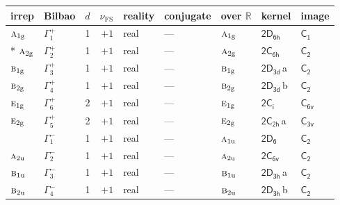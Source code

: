 \documentclass[10pt,a4paper]{article}
\numberwithin{equation}{section}
\newcommand{\grp}[1]{\mathsf{#1}}
\newcommand{\irr}[1]{\text{\normalfont\scshape #1}}
\newcommand{\detbox}[1]{{\setlength{\fboxsep}{1pt}\fbox{#1}}}
\newcommand{\ptag}[1]{\mathrm{#1}}
\newcommand{\clsletter}[1]{\,{\scriptsize\color{black!55}#1}}
\newcommand{\fsind}{\nu_{\mathrm{FS}}}
\begin{document}
{\small\renewcommand{\arraystretch}{1.25}\setlength{\tabcolsep}{4pt}\begin{longtable}{@{}llrrlllll@{}}\toprule
irrep & Bilbao & $d$ & $\fsind$ & reality & conjugate & over $\mathbb{R}$ & kernel & image\\\midrule\endhead
\bottomrule\endfoot\endlastfoot
$\irr{a}_{1\ptag{g}}$ & $\Gamma_{1}^{+}$ & 1 & $+1$ & real & --- & $\irr{a}_{1\ptag{g}}$ & \href{2D6h.pdf}{$\grp{2D_{6h}}$} & \href{../../../rotation/data/pdf/C1.pdf}{$\grp{C_{1}}$}\\*
$\irr{a}_{2\ptag{g}}$ & $\Gamma_{2}^{+}$ & 1 & $+1$ & real & --- & $\irr{a}_{2\ptag{g}}$ & \href{2C6h.pdf}{$\grp{2C_{6h}}$} & \href{../../../rotation/data/pdf/C2.pdf}{$\grp{C_{2}}$}\\
$\irr{b}_{1\ptag{g}}$ & $\Gamma_{3}^{+}$ & 1 & $+1$ & real & --- & $\irr{b}_{1\ptag{g}}$ & \href{2D3d.pdf}{$\grp{2D_{3d}}$}\clsletter{a} & \href{../../../rotation/data/pdf/C2.pdf}{$\grp{C_{2}}$}\\
$\irr{b}_{2\ptag{g}}$ & $\Gamma_{4}^{+}$ & 1 & $+1$ & real & --- & $\irr{b}_{2\ptag{g}}$ & \href{2D3d.pdf}{$\grp{2D_{3d}}$}\clsletter{b} & \href{../../../rotation/data/pdf/C2.pdf}{$\grp{C_{2}}$}\\
$\irr{e}_{1\ptag{g}}$ & $\Gamma_{6}^{+}$ & 2 & $+1$ & real & --- & $\irr{e}_{1\ptag{g}}$ & \href{2S2.pdf}{$\grp{2C_{i}}$} & \href{../../../rotation/data/pdf/C6v.pdf}{$\grp{C_{6v}}$}\\
$\irr{e}_{2\ptag{g}}$ & $\Gamma_{5}^{+}$ & 2 & $+1$ & real & --- & $\irr{e}_{2\ptag{g}}$ & \href{2C2h.pdf}{$\grp{2C_{2h}}$}\clsletter{a} & \href{../../../rotation/data/pdf/C3v.pdf}{$\grp{C_{3v}}$}\\
\detbox{$\irr{a}_{1\ptag{u}}$} & $\Gamma_{1}^{-}$ & 1 & $+1$ & real & --- & $\irr{a}_{1\ptag{u}}$ & \href{2D6.pdf}{$\grp{2D_{6}}$} & \href{../../../rotation/data/pdf/C2.pdf}{$\grp{C_{2}}$}\\
$\irr{a}_{2\ptag{u}}$ & $\Gamma_{2}^{-}$ & 1 & $+1$ & real & --- & $\irr{a}_{2\ptag{u}}$ & \href{2C6v.pdf}{$\grp{2C_{6v}}$} & \href{../../../rotation/data/pdf/C2.pdf}{$\grp{C_{2}}$}\\
$\irr{b}_{1\ptag{u}}$ & $\Gamma_{3}^{-}$ & 1 & $+1$ & real & --- & $\irr{b}_{1\ptag{u}}$ & \href{2D3h.pdf}{$\grp{2D_{3h}}$}\clsletter{a} & \href{../../../rotation/data/pdf/C2.pdf}{$\grp{C_{2}}$}\\
$\irr{b}_{2\ptag{u}}$ & $\Gamma_{4}^{-}$ & 1 & $+1$ & real & --- & $\irr{b}_{2\ptag{u}}$ & \href{2D3h.pdf}{$\grp{2D_{3h}}$}\clsletter{b} & \href{../../../rotation/data/pdf/C2.pdf}{$\grp{C_{2}}$}\\

\end{longtable}}
\end{document}
